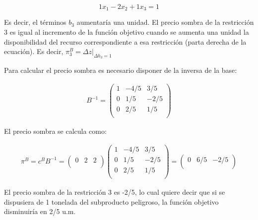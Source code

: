 \begin{enumerate}
    $$1x_1 - 2x_2 + 1x_3 = 1$$

    Es decir, el términos $b_3$ aumentaría una unidad. El precio sombra de la restricción 3 es igual al incremento de la función objetivo cuando se aumenta una unidad la disponibilidad del recurso correspondiente a esa restricción (parta derecha de la ecuación). Es decir, $\pi^B_3 = \Delta z|_{\Delta h_3 = 1}$

    Para calcular el precio sombra es necesario disponer de la inversa de la base:

    \begin{equation}
    \begin{split}
    B^{-1} =\begin{pmatrix}
    1 & -4/5 & 3/5\\
    0 & 1/5 & -2/5\\
    0 & 2/5 & 1/5\\
    \end{pmatrix}
    \end{split}
    \end{equation}
    
    El precio sombra se calcula como:

    \begin{equation}
    \begin{split}
    \pi^B = c^BB^{-1} = \begin{pmatrix}
    0 & 2 & 2\\
    \end{pmatrix}
    \begin{pmatrix}
    1 & -4/5 & 3/5\\
    0 & 1/5 & -2/5\\
    0 & 2/5 & 1/5\\
    \end{pmatrix}
     = \begin{pmatrix}
    0 & 6/5 & -2/5\\
    \end{pmatrix}
    \end{split}
    \end{equation}
    
    El precio sombra de la restricción 3 es -2/5, lo cual quiere decir que si se dispusiera de 1 tonelada del subproducto peligroso, la función objetivo disminuiría en 2/5 u.m.
    
\end{enumerate}






